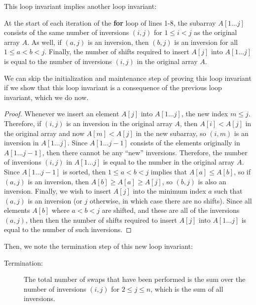 \documentclass[Chapter02]{subfiles}
\begin{document}
\begin{problems}
\begin{problems}
\begin{answer}
				This loop invariant implies another loop invariant:
				\begin{addmargin}[2em]{2em}
					At the start of each iteration of the \textbf{for} loop of lines 1-8, the subarray $A[1 \dots j]$ consists of the same number of inversions $(i,j)$ for $1 \leq i < j$ as the original array $A$. As well, if $(a,j)$ is an inversion, then $(b,j)$ is an inversion for all $1 \leq a < b < j$. Finally, the number of shifts required to insert $A[j]$ into $A[1 \dots j]$ is equal to the number of inversions $(i,j)$ in the original array $A$.
				\end{addmargin}

				We can skip the initialization and maintenance step of proving this loop invariant if we show that this loop invariant is a consequence of the previous loop invariant, which we do now.
				\begin{proof}
					Whenever we insert an element $A[j]$ into $A[1 \dots j]$, the new index $m \leq j$. Therefore, if $(i,j)$ is an inversion in the original array $A$, then $A[i] < A[j]$ in the original array and now $A[m] < A[j]$ in the new subarray, so $(i,m)$ is an inversion in $A[1 \dots j]$. Since $A[1 \dots j - 1]$ consists of the elements originally in $A[1 \dots j-1]$, then there cannot be any ``new'' inversions. Therefore, the number of inversions $(i, j)$ in $A[1 \dots j]$ is equal to the number in the original array $A$. Since $A[1 \dots j-1]$ is sorted, then $1 \leq a < b < j$ implies that $A[a] \leq A[b]$, so if $(a,j)$ is an inversion, then $A[b] \geq A[a] \geq A[j]$, so $(b, j)$ is also an inversion. Finally, we wish to insert $A[j]$ into the minimum index $a$ such that $(a,j)$ is an inversion (or $j$ otherwise, in which case there are no shifts). Since all elements $A[b]$ where $a < b < j$ are shifted, and these are all of the inversions $(a,j)$, then then the number of shifts required to insert $A[j]$ into $A[1 \dots j]$ is equal to the number of such inversions.
				\end{proof}

				Then, we note the termination step of this new loop invariant:
				\begin{description}
					\item[Termination:] The total number of swaps that have been performed is the sum over the number of inversions $(i,j)$ for $2 \leq j \leq n$, which is the sum of all inversions.
				\end{description}
			\end{answer}
			

\end{problems}
\end{problems}
\end{document}
